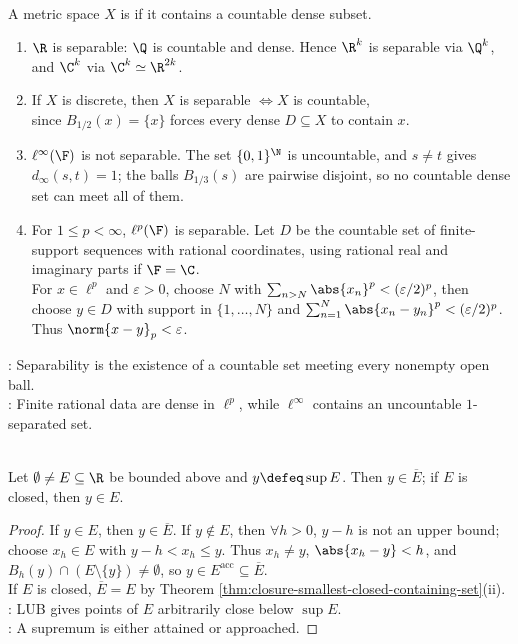 \begin{definition} \label{def:separable-metric-space} \\
A metric space $X$ is  if it contains a countable dense subset.
\end{definition}

\begin{example} \label{ex:separable-and-nonseparable-metric-spaces} 
\begin{enumerate}[label=(\roman*)]
\setlength{\itemsep}{0pt}
\item $\R$ is separable: $\Q$ is countable and dense. Hence $\R^k$ is separable via $\Q^k$, and $\C^k$ via $\C^k\simeq\R^{2k}$.
\item If $X$ is discrete, then $X$ is separable $\Longleftrightarrow X$ is countable,\\
since $B_{1/2}(x)=\{x\}$ forces every dense $D\subseteq X$ to contain $x$.
\item $\ell^\infty(\F)$ is not separable. The set $\{0,1\}^{\N}$ is uncountable, and $s\ne t$ gives $d_\infty(s,t)=1$; the balls $B_{1/3}(s)$ are pairwise disjoint, so no countable dense set can meet all of them.
\item For $1\leq p<\infty$, $\ell^p(\F)$ is separable. Let $D$ be the countable set of finite-support sequences with rational coordinates, using rational real and imaginary parts if $\F=\C$.\\
For $x\in\ell^p$ and $\varepsilon>0$, choose $N$ with $\sum_{n>N}\abs{x_n}^p<(\varepsilon/2)^p$, then choose $y\in D$ with support in $\{1,\ldots,N\}$ and $\sum_{n=1}^N\abs{x_n-y_n}^p<(\varepsilon/2)^p$. Thus $\norm{x-y}_p<\varepsilon$.
\end{enumerate}
: Separability is the existence of a countable set meeting every nonempty open ball.\\
: Finite rational data are dense in $\ell^p$, while $\ell^\infty$ contains an uncountable $1$-separated set.
\end{example}

\begin{theorem} \label{thm:supremum-belongs-to-closure} \\
Let $\emptyset\ne E\subseteq\R$ be bounded above and $y\defeq\sup E$. Then $y\in\overline{E}$; if $E$ is closed, then $y\in E$.
\begin{proof}
If $y\in E$, then $y\in\overline{E}$. If $y\notin E$, then $\forall h>0$, $y-h$ is not an upper bound; choose $x_h\in E$ with $y-h<x_h\leq y$. Thus $x_h\ne y$, $\abs{x_h-y}<h$, and $B_h(y)\cap(E\setminus\{y\})\ne\emptyset$, so $y\in E^{\operatorname{acc}}\subseteq\overline{E}$.\\
If $E$ is closed, $\overline{E}=E$ by Theorem \ref{thm:closure-smallest-closed-containing-set}(ii).\\
: LUB gives points of $E$ arbitrarily close below $\sup E$.\\
: A supremum is either attained or approached.
\end{proof}
\end{theorem}

